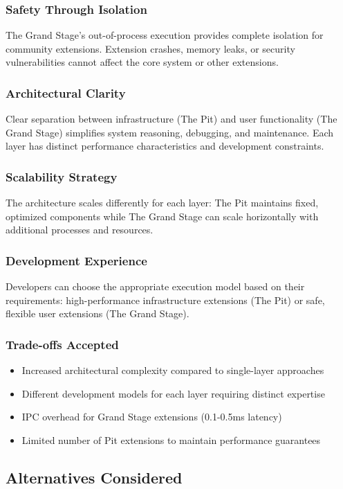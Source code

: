 \subsubsection*{Safety Through Isolation}
The Grand Stage's out-of-process execution provides complete isolation for community extensions. Extension crashes, memory leaks, or security vulnerabilities cannot affect the core system or other extensions.

\subsubsection*{Architectural Clarity}
Clear separation between infrastructure (The Pit) and user functionality (The Grand Stage) simplifies system reasoning, debugging, and maintenance. Each layer has distinct performance characteristics and development constraints.

\subsubsection*{Scalability Strategy}
The architecture scales differently for each layer: The Pit maintains fixed, optimized components while The Grand Stage can scale horizontally with additional processes and resources.

\subsubsection*{Development Experience}
Developers can choose the appropriate execution model based on their requirements: high-performance infrastructure extensions (The Pit) or safe, flexible user extensions (The Grand Stage).

\subsubsection*{Trade-offs Accepted}
\begin{itemize}
\item Increased architectural complexity compared to single-layer approaches
\item Different development models for each layer requiring distinct expertise
\item IPC overhead for Grand Stage extensions (0.1-0.5ms latency)
\item Limited number of Pit extensions to maintain performance guarantees
\end{itemize}

\subsection*{Alternatives Considered}

